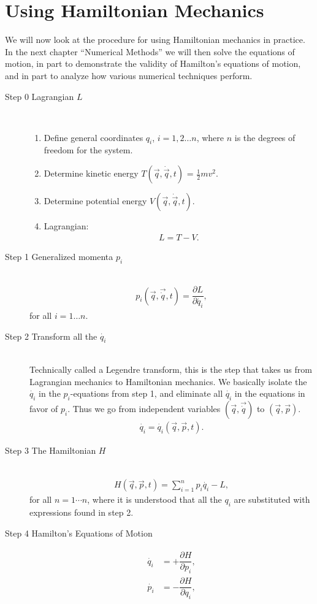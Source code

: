 \section{Using Hamiltonian Mechanics}
We will now look at the procedure for using Hamiltonian mechanics in practice. In the next chapter ``Numerical Methods'' we will then solve the equations of motion, in part to demonstrate the validity of Hamilton's equations of motion, and in part to analyze how various numerical techniques perform.
\begin{description}
\item[Step 0 \quad Lagrangian $L$] \ \\[-0.5cm]
\begin{enumerate}[label=\alph*)]
\item Define general coordinates $q_i$, $i=1,2 \dots n$, where $n$ is the degrees of freedom for the system.
\item Determine kinetic energy $T(\vec{q},\dot{\vec{q}}, t)$ = $\frac{1}{2}m v^2$.
\item Determine potential energy $V(\vec{q},\dot{\vec{q}}, t)$.
\item Lagrangian: \begin{align}
L = T - V.
\end{align}
\end{enumerate}
\item[Step 1 \quad Generalized momenta $p_i$] \ \\[-0.5cm]
\begin{align}
p_i(\vec{q},\vec{\dot{q}}, t) = \dfrac{\partial L}{\partial \dot{q_i}},
\end{align}
for all $i = 1 \dots n$.
%
\item[Step 2 \quad Transform all the $\dot{q_i}$] \ \\[0.5cm]
Technically called a Legendre transform, this is the step that takes us from Lagrangian mechanics to Hamiltonian mechanics. We basically isolate the $\dot{q_i}$ in the $p_i$-equations from step 1, and eliminate all $\dot{q_i}$ in the equations in favor of $p_i$. Thus we go from independent variables $(\vec{q}, \vec{\dot{q}})$ to $(\vec{q}, \vec{p})$.
\begin{align}
\dot{q_i} = \dot{q_i}(\vec{q}, \vec{p}, t).
\end{align}
%
\item[Step 3 \quad The Hamiltonian $H$] \ \\[-0.5cm]
\begin{align}
H(\vec{q}, \vec{p}, t) = \sum\limits_{i=1}^n p_i \dot{q_i} - L,
\end{align}
for all $n=1\cdots n$, where it is understood that all the $q_i$ are substituted with expressions found in step 2.
%
\item[Step 4 \quad Hamilton's Equations of Motion]
\begin{align}
\begin{split}
\dot{q_i} &= +\dfrac{\partial H}{\partial p_i},
\\[0.2cm]
\dot{p_i} &= -\dfrac{\partial H}{\partial q_i},
\end{split}
\end{align}
\end{description}
